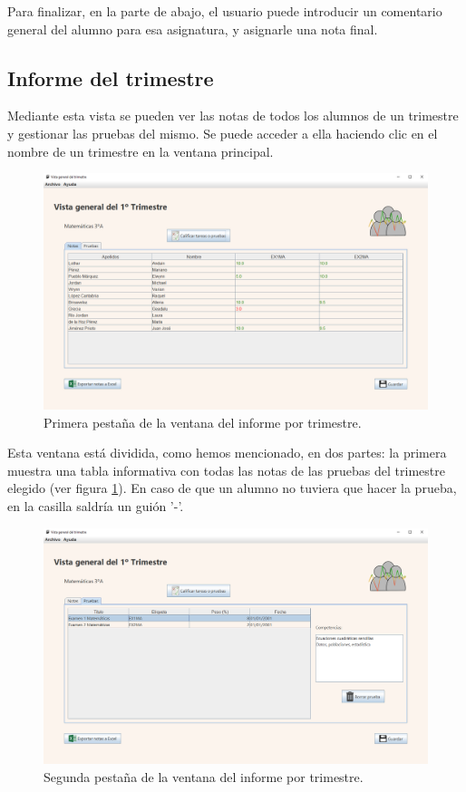 Para finalizar, en la parte de abajo, el usuario puede introducir un comentario general del alumno para esa asignatura, y asignarle una nota final.

\subsection{Informe del trimestre}
Mediante esta vista se pueden ver las notas de todos los alumnos de un trimestre y gestionar las pruebas del mismo. Se puede acceder a ella haciendo clic en el nombre de un trimestre en la ventana principal.

\begin{figure}[h]
\centering\includegraphics[width=1\linewidth]{figs/informetrimestre.png}
\caption{Primera pestaña de la ventana del informe por trimestre.}
\label{Fig:informetrimestre}
\end{figure}

Esta ventana está dividida, como hemos mencionado, en dos partes: la primera muestra una tabla informativa con todas las notas de las pruebas del trimestre elegido (ver figura \ref{Fig:informetrimestre}). En caso de que un alumno no tuviera que hacer la prueba, en la casilla saldría un guión '-'. 

\begin{figure}[h]
\centering\includegraphics[width=1\linewidth]{figs/informetrimestre2.png}
\caption{Segunda pestaña de la ventana del informe por trimestre.}
\label{Fig:informetrimestre2}
\end{figure}

